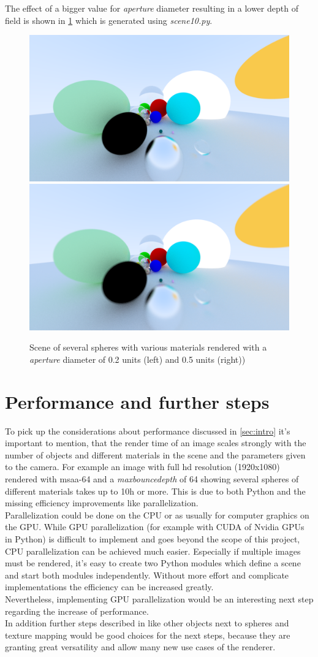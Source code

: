 \documentclass[]{article}
\begin{document}
			The effect of a bigger value for \emph{aperture} diameter resulting in a lower depth of field is shown in \cref{fig:image10} which is generated using \emph{scene10.py}.
			
			\begin{figure}[h]
				\centering
				\includegraphics[width=0.45\linewidth]{image10}
				\includegraphics[width=0.45\linewidth]{image10-2}
				\caption{Scene of several spheres with various materials rendered with a \emph{aperture} diameter of 0.2 units (left) and 0.5 units (right))}
				\label{fig:image10}
			\end{figure}			
		
	\section{Performance and further steps}
		\label{sec:performance}
		To pick up the considerations about performance discussed in \cref{sec:intro} it's important to mention, that the render time of an image scales strongly with the number of objects and different materials in the scene and the parameters given to the camera. For example an image with full hd resolution (1920x1080) rendered with \ac{msaa}-64 and a \emph{max\textunderscore bounce\textunderscore depth} of 64 showing several spheres of different materials takes up to 10h or more. This is due to both Python and the missing efficiency improvements like parallelization. 
		\\
		Parallelization could be done on the CPU or as usually for computer graphics on the GPU. While GPU parallelization (for example with CUDA of Nvidia GPUs in Python) is difficult to implement and goes beyond the scope of this project, CPU parallelization can be achieved much easier. Especially if multiple images must be rendered, it's easy to create two Python modules which define a scene and start both modules independently. Without more effort and complicate implementations the efficiency can be increased greatly.
		\\
		Nevertheless, implementing GPU parallelization would be an interesting next step regarding the increase of performance.
		\\
		In addition further steps described in \cite{Shirley2020RTW2} like other objects next to spheres and texture mapping would be good choices for the next steps, because they are granting great versatility and allow many new use cases of the renderer.	
		
\end{document}
